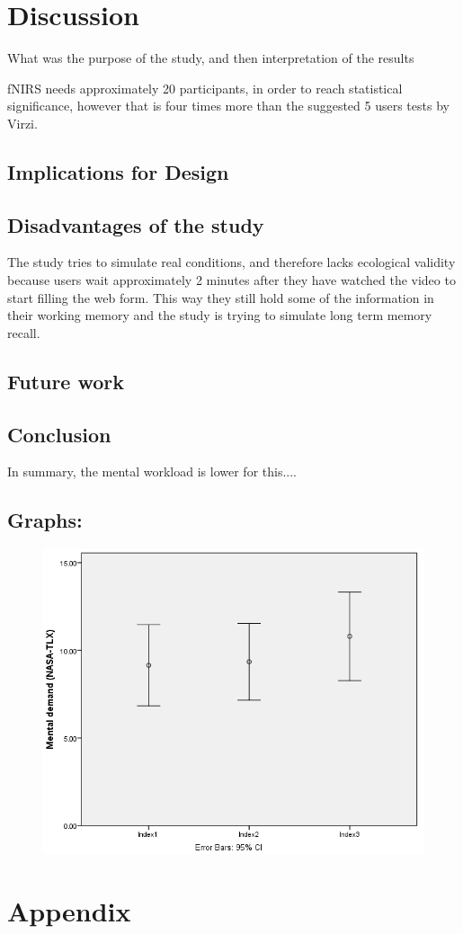 \documentclass[a4paper]{report}
\begin{document}
\chapter{Discussion}
	What was the purpose of the study, and then interpretation of the results
	
	fNIRS needs approximately 20 participants, in order to reach statistical significance, however that is four times more than the suggested 5 users tests by Virzi\cite{virzi1992refining}.
	\section{Implications for Design}
	\section{Disadvantages of the study}
		The study tries to simulate real conditions, and therefore lacks ecological validity because users wait approximately 2 minutes after they have watched the video to start filling the web form. This way they still hold some of the information in their working memory and the study is trying to simulate long term memory recall.
	\section{Future work}
	\section{Conclusion}
		In summary, the mental workload is lower for this....

	\section*{Graphs:}
		\begin{figure}[h]
			\centering
			\includegraphics[width=0.6\linewidth]{mental-demand-graph}
			\caption{}
			\label{fig:mental-demand-graph}
		\end{figure}

	
	
\chapter*{Appendix}
\end{document}
